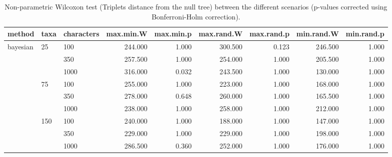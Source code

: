 \begin{table}[ht]
\centering
\begin{tabular}{lllrrrrrr}
  \hline
method & taxa & characters & max.min.W & max.min.p & max.rand.W & max.rand.p & min.rand.W & min.rand.p \\ 
  \hline
bayesian & 25 & 100 & 244.000 & 1.000 & 300.500 & 0.123 & 246.500 & 1.000 \\ 
   &  & 350 & 257.500 & 1.000 & 254.000 & 1.000 & 205.500 & 1.000 \\ 
   &  & 1000 & 316.000 & 0.032 & 243.500 & 1.000 & 130.000 & 1.000 \\ 
   & 75 & 100 & 255.000 & 1.000 & 223.000 & 1.000 & 168.000 & 1.000 \\ 
   &  & 350 & 278.000 & 0.648 & 260.000 & 1.000 & 165.500 & 1.000 \\ 
   &  & 1000 & 238.000 & 1.000 & 258.000 & 1.000 & 212.000 & 1.000 \\ 
   & 150 & 100 & 240.000 & 1.000 & 188.000 & 1.000 & 147.000 & 1.000 \\ 
   &  & 350 & 229.000 & 1.000 & 229.000 & 1.000 & 198.000 & 1.000 \\ 
   &  & 1000 & 286.500 & 0.360 & 252.000 & 1.000 & 176.000 & 1.000 \\ 
   \hline
\end{tabular}
\caption{Non-parametric Wilcoxon test (Triplets distance from the null tree) between the different scenarios (p-values corrected using Bonferroni-Holm correction).} 
\label{Full_Tab_Bayesian_WXTrnull}
\end{table}
